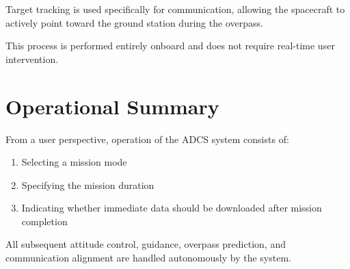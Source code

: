 Target tracking is used specifically for communication, allowing the spacecraft to actively point toward the ground station during the overpass.

This process is performed entirely onboard and does not require real-time user intervention.

\section{Operational Summary}

From a user perspective, operation of the ADCS system consists of:

\begin{enumerate}
	\item Selecting a mission mode
	\item Specifying the mission duration
	\item Indicating whether immediate data should be downloaded after mission completion
\end{enumerate}

All subsequent attitude control, guidance, overpass prediction, and communication alignment are handled autonomously by the system.